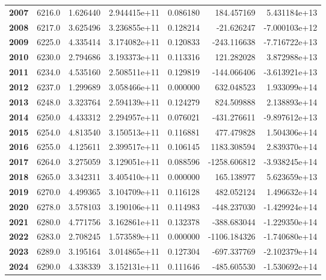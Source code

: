 \documentclass{report}[12pt]
\begin{document}
\begin{center}
\begin{tabular}{lrrrrrr}
\textbf{2007} &         6216.0 &   1.626440 &  2.944415e+11 &    0.086180 &   184.457169 &  5.431184e+13 \\
\textbf{2008} &         6217.0 &   3.625496 &  3.236855e+11 &    0.128214 &   -21.626247 & -7.000103e+12 \\
\textbf{2009} &         6225.0 &   4.335414 &  3.174082e+11 &    0.120833 &  -243.116638 & -7.716722e+13 \\
\textbf{2010} &         6230.0 &   2.794686 &  3.193373e+11 &    0.113316 &   121.282028 &  3.872988e+13 \\
\textbf{2011} &         6234.0 &   4.535160 &  2.508511e+11 &    0.129819 &  -144.066406 & -3.613921e+13 \\
\textbf{2012} &         6237.0 &   1.299689 &  3.058466e+11 &    0.000000 &   632.048523 &  1.933099e+14 \\
\textbf{2013} &         6248.0 &   3.323764 &  2.594139e+11 &    0.124279 &   824.509888 &  2.138893e+14 \\
\textbf{2014} &         6250.0 &   4.433312 &  2.294957e+11 &    0.076021 &  -431.276611 & -9.897612e+13 \\
\textbf{2015} &         6254.0 &   4.813540 &  3.150513e+11 &    0.116881 &   477.479828 &  1.504306e+14 \\
\textbf{2016} &         6255.0 &   4.125611 &  2.399517e+11 &    0.106145 &  1183.308594 &  2.839370e+14 \\
\textbf{2017} &         6264.0 &   3.275059 &  3.129051e+11 &    0.088596 & -1258.606812 & -3.938245e+14 \\
\textbf{2018} &         6265.0 &   3.342311 &  3.405410e+11 &    0.000000 &   165.138977 &  5.623659e+13 \\
\textbf{2019} &         6270.0 &   4.499365 &  3.104709e+11 &    0.116128 &   482.052124 &  1.496632e+14 \\
\textbf{2020} &         6278.0 &   3.578103 &  3.190106e+11 &    0.114983 &  -448.237030 & -1.429924e+14 \\
\textbf{2021} &         6280.0 &   4.771756 &  3.162861e+11 &    0.132378 &  -388.683044 & -1.229350e+14 \\
\textbf{2022} &         6283.0 &   2.708245 &  1.573589e+11 &    0.000000 & -1106.184326 & -1.740680e+14 \\
\textbf{2023} &         6289.0 &   3.195164 &  3.014865e+11 &    0.127304 &  -697.337769 & -2.102379e+14 \\
\textbf{2024} &         6290.0 &   4.338339 &  3.152131e+11 &    0.111646 &  -485.605530 & -1.530692e+14 \\

\end{tabular}
\end{center}
\end{document}
